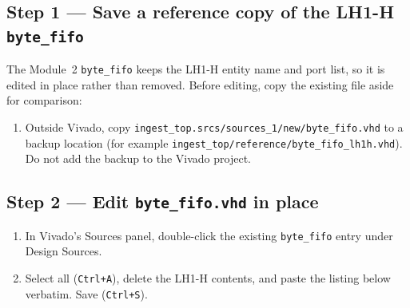 \documentclass[11pt,letterpaper]{article}
\begin{document}
\subsection{Step 1 --- Save a reference copy of the LH1-H \texttt{byte\_fifo}}

The Module~2 \texttt{byte\_fifo} keeps the LH1-H entity name and port list, so it is edited in place rather than removed. Before editing, copy the existing file aside for comparison:

\begin{enumerate}[leftmargin=2em]
	\item Outside Vivado, copy \texttt{ingest\_top.srcs/sources\_1/new/byte\_fifo.vhd} to a backup location (for example \texttt{ingest\_top/reference/byte\_fifo\_lh1h.vhd}). Do not add the backup to the Vivado project.
\end{enumerate}

\subsection{Step 2 --- Edit \texttt{byte\_fifo.vhd} in place}
\begin{enumerate}[leftmargin=2em]
	\item In Vivado's Sources panel, double-click the existing \texttt{byte\_fifo} entry under Design Sources.
	\item Select all (\texttt{Ctrl+A}), delete the LH1-H contents, and paste the listing below verbatim. Save (\texttt{Ctrl+S}).
\end{enumerate}
\end{document}
